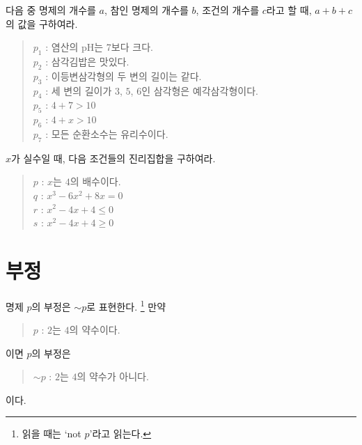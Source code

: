 \documentclass{oblivoir}
\begin{document}
%

%
\prob{}\label{proposition2}
다음 중 명제의 개수를 \(a\), 참인 명제의 개수를 \(b\), 조건의 개수를 \(c\)라고 할 때, \(a+b+c\)의 값을 구하여라.
\begin{quote}
\(p_1\) : 염산의 pH는 7보다 크다.\\
\(p_2\) : 삼각김밥은 맛있다.\\
\(p_3\) : 이등변삼각형의 두 변의 길이는 같다.\\
\(p_4\) : 세 변의 길이가 \(3\), \(5\), \(6\)인 삼각형은 예각삼각형이다.\\
\(p_5\) : \(4+7>10\)\\
\(p_6\) : \(4+x>10\)\\
\(p_7\) : 모든 순환소수는 유리수이다.\\
\end{quote}

%
\prob{}\label{proposition3}
\(x\)가 실수일 때, 다음 조건들의 진리집합을 구하여라.
\begin{quote}
\(p\) : \(x\)는 \(4\)의 배수이다.\\
\(q\) : \(x^3-6x^2+8x=0\)\\
\(r\) : \(x^2-4x+4\le0\)\\
\(s\) : \(x^2-4x+4\ge0\)
\end{quote}

\section{부정}
%
\label{negation1}
명제 \(p\)의 부정은 \(\sim p\)로 표현한다.%
\footnote{읽을 때는 `not \(p\)’라고 읽는다.}
만약
\begin{quote}
\(p\) : \(2\)는 \(4\)의 약수이다.
\end{quote}
이면 \(p\)의 부정은
\begin{quote}
\(\sim p\) : \(2\)는 \(4\)의 약수가 아니다.
\end{quote}
이다.
\end{document}
